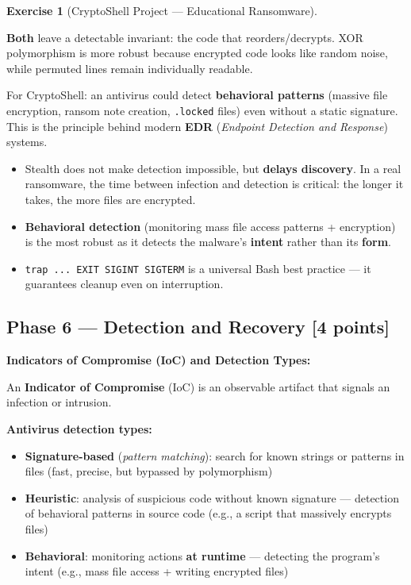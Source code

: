 \documentclass[a4paper,11pt]{article}
\theoremstyle{plain}
\theoremstyle{definition}
\newtheorem{exercice}{Exercise}
\begin{document}
\begin{exercice}[CryptoShell Project --- Educational Ransomware]
\begin{correction}
\textbf{Both} leave a detectable invariant: the code that reorders/decrypts. XOR polymorphism is more robust because encrypted code looks like random noise, while permuted lines remain individually readable.

For CryptoShell: an antivirus could detect \textbf{behavioral patterns} (massive file encryption, ransom note creation, \texttt{.locked} files) even without a static signature. This is the principle behind modern \textbf{EDR} (\textit{Endpoint Detection and Response}) systems.

\begin{pointcle}
\begin{itemize}
    \item Stealth does not make detection impossible, but \textbf{delays discovery}. In a real ransomware, the time between infection and detection is critical: the longer it takes, the more files are encrypted.
    \item \textbf{Behavioral detection} (monitoring mass file access patterns + encryption) is the most robust as it detects the malware's \textbf{intent} rather than its \textbf{form}.
    \item \texttt{trap ... EXIT SIGINT SIGTERM} is a universal Bash best practice --- it guarantees cleanup even on interruption.
\end{itemize}
\end{pointcle}

\end{correction}



\subsection*{Phase 6 --- Detection and Recovery \hfill \normalsize [4 points]}

\begin{rappel}
\textbf{Indicators of Compromise (IoC) and Detection Types:}

An \textbf{Indicator of Compromise} (IoC) is an observable artifact that signals an infection or intrusion.

\medskip
\textbf{Antivirus detection types:}
\begin{itemize}
    \item \textbf{Signature-based} (\textit{pattern matching}): search for known strings or patterns in files (fast, precise, but bypassed by polymorphism)
    \item \textbf{Heuristic}: analysis of suspicious code without known signature --- detection of behavioral patterns in source code (e.g., a script that massively encrypts files)
    \item \textbf{Behavioral}: monitoring actions \textbf{at runtime} --- detecting the program's intent (e.g., mass file access + writing encrypted files)
\end{itemize}


\end{rappel}
\end{exercice}
\end{document}
